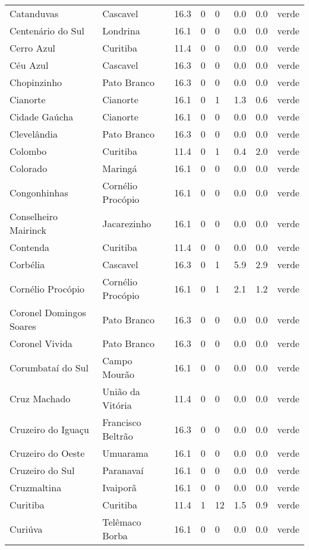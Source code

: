 \begin{longtable}{l|lllllll}
  Catanduvas & Cascavel & 16.3 & 0 & 0 & 0.0 & 0.0 & verde \\ 
  Centenário do Sul & Londrina & 16.1 & 0 & 0 & 0.0 & 0.0 & verde \\ 
  Cerro Azul & Curitiba & 11.4 & 0 & 0 & 0.0 & 0.0 & verde \\ 
  Céu Azul & Cascavel & 16.3 & 0 & 0 & 0.0 & 0.0 & verde \\ 
  Chopinzinho & Pato Branco & 16.3 & 0 & 0 & 0.0 & 0.0 & verde \\ 
  Cianorte & Cianorte & 16.1 & 0 & 1 & 1.3 & 0.6 & verde \\ 
  Cidade Gaúcha & Cianorte & 16.1 & 0 & 0 & 0.0 & 0.0 & verde \\ 
  Clevelândia & Pato Branco & 16.3 & 0 & 0 & 0.0 & 0.0 & verde \\ 
  Colombo & Curitiba & 11.4 & 0 & 1 & 0.4 & 2.0 & verde \\ 
  Colorado & Maringá & 16.1 & 0 & 0 & 0.0 & 0.0 & verde \\ 
  Congonhinhas & Cornélio Procópio & 16.1 & 0 & 0 & 0.0 & 0.0 & verde \\ 
  Conselheiro Mairinck & Jacarezinho & 16.1 & 0 & 0 & 0.0 & 0.0 & verde \\ 
  Contenda & Curitiba & 11.4 & 0 & 0 & 0.0 & 0.0 & verde \\ 
  Corbélia & Cascavel & 16.3 & 0 & 1 & 5.9 & 2.9 & verde \\ 
  Cornélio Procópio & Cornélio Procópio & 16.1 & 0 & 1 & 2.1 & 1.2 & verde \\ 
  Coronel Domingos Soares & Pato Branco & 16.3 & 0 & 0 & 0.0 & 0.0 & verde \\ 
  Coronel Vivida & Pato Branco & 16.3 & 0 & 0 & 0.0 & 0.0 & verde \\ 
  Corumbataí do Sul & Campo Mourão & 16.1 & 0 & 0 & 0.0 & 0.0 & verde \\ 
  Cruz Machado & União da Vitória & 11.4 & 0 & 0 & 0.0 & 0.0 & verde \\ 
  Cruzeiro do Iguaçu & Francisco Beltrão & 16.3 & 0 & 0 & 0.0 & 0.0 & verde \\ 
  Cruzeiro do Oeste & Umuarama & 16.1 & 0 & 0 & 0.0 & 0.0 & verde \\ 
  Cruzeiro do Sul & Paranavaí & 16.1 & 0 & 0 & 0.0 & 0.0 & verde \\ 
  Cruzmaltina & Ivaiporã & 16.1 & 0 & 0 & 0.0 & 0.0 & verde \\ 
  Curitiba & Curitiba & 11.4 & 1 & 12 & 1.5 & 0.9 & verde \\ 
  Curiúva & Telêmaco Borba & 16.1 & 0 & 0 & 0.0 & 0.0 & verde \\ 

\end{longtable}
